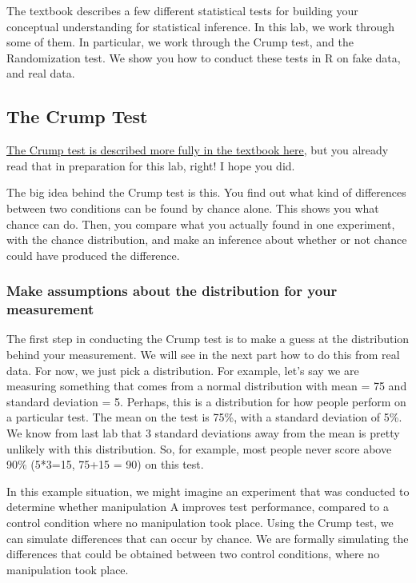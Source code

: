 \documentclass[
]{book}
\begin{document}
The textbook describes a few different statistical tests for building your conceptual understanding for statistical inference. In this lab, we work through some of them. In particular, we work through the Crump test, and the Randomization test. We show you how to conduct these tests in R on fake data, and real data.

\hypertarget{the-crump-test}{%
\subsection{The Crump Test}\label{the-crump-test}}

\href{https://crumplab.github.io/statistics/foundations-for-inference.html\#the-crump-test}{The Crump test is described more fully in the textbook here}, but you already read that in preparation for this lab, right! I hope you did.

The big idea behind the Crump test is this. You find out what kind of differences between two conditions can be found by chance alone. This shows you what chance can do. Then, you compare what you actually found in one experiment, with the chance distribution, and make an inference about whether or not chance could have produced the difference.

\hypertarget{make-assumptions-about-the-distribution-for-your-measurement}{%
\subsubsection{Make assumptions about the distribution for your measurement}\label{make-assumptions-about-the-distribution-for-your-measurement}}

The first step in conducting the Crump test is to make a guess at the distribution behind your measurement. We will see in the next part how to do this from real data. For now, we just pick a distribution. For example, let's say we are measuring something that comes from a normal distribution with mean = 75 and standard deviation = 5. Perhaps, this is a distribution for how people perform on a particular test. The mean on the test is 75\%, with a standard deviation of 5\%. We know from last lab that 3 standard deviations away from the mean is pretty unlikely with this distribution. So, for example, most people never score above 90\% (5*3=15, 75+15 = 90) on this test.

In this example situation, we might imagine an experiment that was conducted to determine whether manipulation A improves test performance, compared to a control condition where no manipulation took place. Using the Crump test, we can simulate differences that can occur by chance. We are formally simulating the differences that could be obtained between two control conditions, where no manipulation took place.
\end{document}
